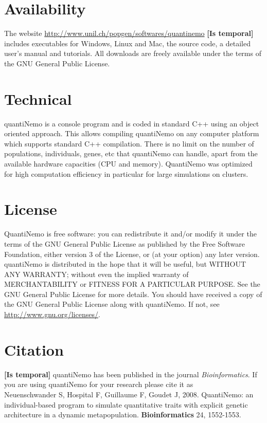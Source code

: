 \documentclass[letterpaper,12pt,oneside]{book}
\newcommand{\tbc}[1]{\small {\bf \color{red} [Is temporal]} \normalsize} %
\begin{document}
\section{Availability}
The website \linebreak\url{http://www.unil.ch/popgen/softwares/quantinemo} \tbc{} includes executables for Windows, Linux and Mac, the source code, a detailed user's manual and  tutorials.  All downloads are freely available under the terms of the GNU General Public License.

\section{Technical}
quantiNemo is a console program and is coded in standard C++ using an object oriented approach. This allows compiling quantiNemo on any computer platform which supports standard C++ compilation. There is no limit on the number of populations, individuals, genes, etc that quantiNemo can handle, apart from the available hardware capacities (CPU and memory). QuantiNemo was optimized for high computation efficiency in particular for large simulations on clusters. 

\section{License}
QuantiNemo is free software: you can redistribute it and/or modify it under the terms of the GNU General Public License as published by the Free Software Foundation, either version 3 of the License, or (at your option) any later version. quantiNemo is distributed in the hope that it will be useful, but WITHOUT ANY WARRANTY; without even the implied warranty of MERCHANTABILITY or FITNESS FOR A PARTICULAR PURPOSE.  See the GNU General Public License for more details. You should have received a copy of the GNU General Public License along with quantiNemo. If not, see \linebreak\url{http://www.gnu.org/licenses/}.

\section{Citation}
\tbc{}
quantiNemo has been published in the journal \textit{Bioinformatics}. If you are using quantiNemo for your research please cite it as \\
 Neuenschwander S, Hospital F, Guillaume F, Goudet J, 2008. QuantiNemo: an individual-based program to simulate quantitative traits with explicit genetic architecture in a dynamic metapopulation. \textbf{Bioinformatics} 24, 1552-1553.
\end{document}
